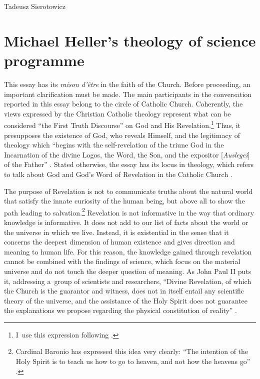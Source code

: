 \begin{artengenv}{Tadeusz Sierotowicz}
\section{Michael Heller's theology of science programme}

This essay has its \textit{raison d'être} in the faith of the Church. Before proceeding, an important clarification must be made. The main participants in the conversation reported in this essay belong to the circle of Catholic Church. Coherently, the views expressed by the Christian Catholic theology represent what can be considered ``the First Truth Discourse'' on God and His Revelation.\footnote{I~use this expression following 
\parencite[][pp.26–39]{tyson_christian_2022}. %
 } Thus, it presupposes the existence of God, who reveals Himself, and the legitimacy of theology which ``begins with the self-revelation of the triune God in the Incarnation of the divine Logos, the Word, the Son, and the expositor [\textit{Auslegei}] of the Father'' 
\parencite[][p.11]{balthasar_theo-logic_2004}. %
 Stated otherwise, the essay has its locus in theology, which refers to talk about God and God's Word of Revelation in the Catholic Church 
\parencite[an expression, \textit{mutatis mutandis}, of][p.2]{barth_church_2010}.%




The purpose of Revelation is not to communicate truths about the natural world that satisfy the innate curiosity of the human being, but above all to show the path leading to salvation.\footnote{Cardinal Baronio has expressed this idea very clearly: ``The intention of the Holy Spirit is to teach us how to go to heaven, and not how the heavens go'' 
\parencite[][p.185]{mcmullin_augustine_1999}. %
 } Revelation is not informative in the way that ordinary knowledge is informative. It does not add to our list of facts about the world or the universe in which we live. Instead, it is existential in the sense that it concerns the deepest dimension of human existence and gives direction and meaning to human life. For this reason, the knowledge gained through revelation cannot be combined with the findings of science, which focus on the material universe and do not touch the deeper question of meaning. As John Paul II puts it, addressing a~group of scientists and researchers, ``Divine Revelation, of which the Church is the guarantor and witness, does not in itself entail any scientific theory of the universe, and the assistance of the Holy Spirit does not guarantee the explanations we propose regarding the physical constitution of reality'' 
\parencite[][]{john_paul_ii_address_1983}.%





\end{artengenv}
